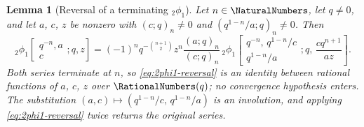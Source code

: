 \documentclass[11pt,a4paper,oneside,openany]{book}
\newtheorem{lemma}[lemma]{Lemma}
\theoremstyle{definition}
\theoremstyle{remark}
\begin{document}
\begin{lemma}[Reversal of a terminating ${}_2\phi_1$]\label{lem:2phi1-reversal}
Let $n\in\NaturalNumbers$, let $q\ne0$, and let $a$, $c$, $z$ be nonzero with
$(c;q)_n\ne0$ and $(q^{1-n}/a;q)_n\ne0$.  Then
\begin{equation}
 {}_2\phi_1\!\left[
 \begin{matrix}q^{-n},a\\c\end{matrix};q,z\right]
 =(-1)^nq^{-\binom{n+1}{2}}z^{n}\frac{(a;q)_n}{(c;q)_n}\,
 {}_2\phi_1\!\left[
 \begin{matrix}q^{-n},\,q^{1-n}/c\\[2pt] q^{1-n}/a\end{matrix};q,
 \,\frac{cq^{n+1}}{az}\right].
 \label{eq:2phi1-reversal}
\end{equation}
Both series terminate at $n$, so \eqref{eq:2phi1-reversal} is an identity between rational functions of $a$, $c$, $z$ over $\RationalNumbers(q)$; no convergence hypothesis enters.  The substitution $(a,c)\mapsto(q^{1-n}/c,\,q^{1-n}/a)$ is an involution, and applying \eqref{eq:2phi1-reversal} twice returns the original series.
\end{lemma}
\end{document}
